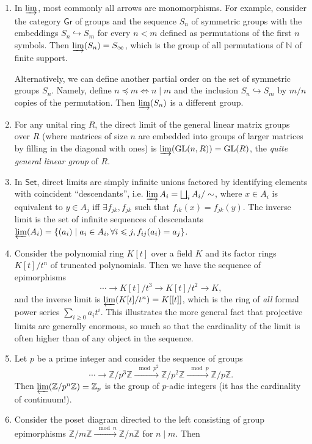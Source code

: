\documentclass[english,letterpaper]{article}%
\numberwithin{equation}{section}
\numberwithin{figure}{section}
\numberwithin{table}{section}
\theoremstyle{definition}
\theoremstyle{definition}
\theoremstyle{definition}
\theoremstyle{plain}
\theoremstyle{plain}
\theoremstyle{plain}
\theoremstyle{plain}
\theoremstyle{remark}
\theoremstyle{remark}
\renewcommand{\geq}{\geqslant}
\renewcommand{\leq}{\leqslant}
\DeclareMathOperator{\GL}{GL}
\newcommand{\colimit}{\varinjlim}
\newcommand{\limit}{\varprojlim}
\begin{document}
\begin{example}
\begin{enumerate}
    \item In $\colimit$, most commonly all arrows are monomorphisms. For example, consider the category $\mathsf{Gr}$ of groups and the sequence $S_n$ of symmetric groups with the embeddings $S_n\hookrightarrow S_m$ for every $n<m$ defined as permutations of the first $n$ symbols. Then $\colimit(S_n)=S_\infty$, which is the group of all permutations of $\mathbb{N}$ of finite support.
    
    Alternatively, we can define another partial order on the set of symmetric groups $S_n$. Namely, define $n\preccurlyeq m\Leftrightarrow n\mid m$ and the inclusion $S_n\hookrightarrow S_m$ by $m/n$ copies of the permutation. Then $\colimit (S_n)$ is a different group.
    \item For any unital ring $R$, the direct limit of the general linear matrix groups over $R$ (where matrices of size $n$ are embedded into groups of larger matrices by filling in the diagonal with ones) is $\colimit(\GL(n,R))=\GL(R)$, the \emph{quite general linear group} of $R$.
    \item In $\mathsf{Set}$, direct limits are simply infinite unions factored by identifying elements with coincident ``descendants'', i.e. $\colimit A_i=\bigsqcup_i A_i/\sim$, where $x\in A_i$ is equivalent to $y\in A_j$ iff $\exists f_{jk},f_{jk}$ such that $f_{ik}(x)=f_{jk}(y)$. The inverse limit is the set of infinite sequences of descendants $\limit (A_i)=\{(a_i)\mid a_i\in A_i,\forall i\leq j, f_{ij}(a_i)=a_j\}$.
    \item Consider the polynomial ring $K[t]$ over a field $K$ and its factor rings $K[t]/t^n$ of truncated polynomials. Then we have the sequence of epimorphisms 
    \[\cdots \to K[t]/t^3\to K[t]/t^2\to K,\]
    and the inverse limit is $\limit(K[t]/t^n)=K[[t]]$, which is the ring of \emph{all} formal power series $\sum_{i\geq 0}a_i t^i$. This illustrates the more general fact that projective limits are generally enormous, so much so that the cardinality of the limit is often higher than of any object in the sequence.
    \item Let $p$ be a prime integer and consider the sequence of groups
    \[\cdots\to \mathbb{Z}/p^3 \mathbb{Z}\overset{\mod p^2}\to \mathbb{Z}/p^2\mathbb{Z}\overset{\mod p}\to \mathbb{Z}/p\mathbb{Z}.\]
    Then $\limit(\mathbb{Z}/p^n\mathbb{Z})=\mathbb{Z}_p$ is the group of $p$-adic integers (it has the cardinality of continuum!).
    \item Consider the poset diagram directed to the left consisting of group epimorphisms $\mathbb{Z}/m\mathbb{Z}\overset{\mod n}\to \mathbb{Z}/n\mathbb{Z}$ for $n\mid m$. Then 

\end{enumerate}
\end{example}
\end{document}
